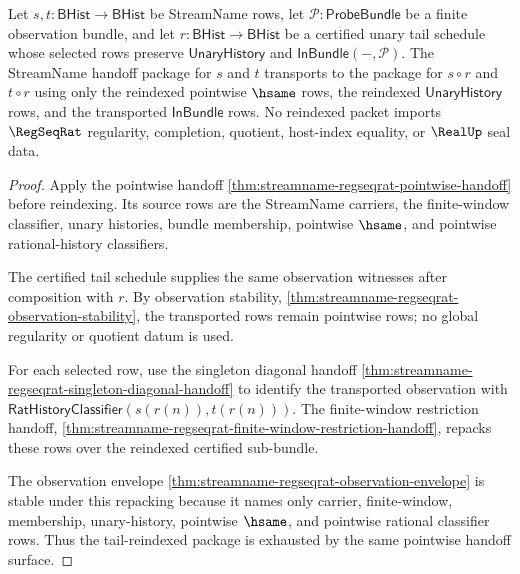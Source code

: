 \begin{theorem}
\label{thm:streamname-regseqrat-tail-reindexing-stability}
Let $s,t:\mathsf{BHist}\to\mathsf{BHist}$ be StreamName rows, let
$\mathcal P:\mathsf{ProbeBundle}$ be a finite observation bundle, and let
$r:\mathsf{BHist}\to\mathsf{BHist}$ be a certified unary tail schedule whose
selected rows preserve $\mathsf{UnaryHistory}$ and
$\mathsf{InBundle}(-,\mathcal P)$. The StreamName handoff package for $s$
and $t$ transports to the package for $s\circ r$ and $t\circ r$ using only
the reindexed pointwise $\hsame$ rows, the reindexed $\mathsf{UnaryHistory}$
rows, and the transported $\mathsf{InBundle}$ rows. No reindexed packet
imports $\RegSeqRat$ regularity, completion, quotient, host-index equality,
or $\RealUp$ seal data.
\end{theorem}
\begin{proof}
Apply the pointwise handoff
\autoref{thm:streamname-regseqrat-pointwise-handoff} before reindexing. Its
source rows are the StreamName carriers, the finite-window classifier, unary
histories, bundle membership, pointwise $\hsame$, and pointwise
rational-history classifiers.

The certified tail schedule supplies the same observation witnesses after
composition with $r$. By observation stability,
\autoref{thm:streamname-regseqrat-observation-stability}, the transported
rows remain pointwise rows; no global regularity or quotient datum is used.

For each selected row, use the singleton diagonal handoff
\autoref{thm:streamname-regseqrat-singleton-diagonal-handoff} to identify
the transported observation with
$\mathsf{RatHistoryClassifier}(s(r(n)),t(r(n)))$. The finite-window
restriction handoff,
\autoref{thm:streamname-regseqrat-finite-window-restriction-handoff}, repacks
these rows over the reindexed certified sub-bundle.

The observation envelope
\autoref{thm:streamname-regseqrat-observation-envelope} is stable under this
repacking because it names only carrier, finite-window, membership,
unary-history, pointwise $\hsame$, and pointwise rational classifier rows.
Thus the tail-reindexed package is exhausted by the same pointwise handoff
surface.
\end{proof}

